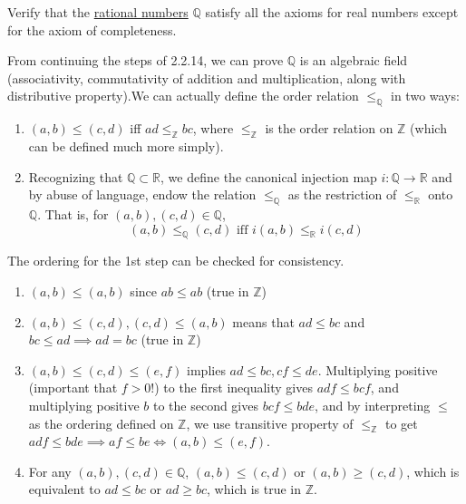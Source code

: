   \begin{exercise}[Zorich 2.2.13]
    Verify that the \hyperref[alg-def:rational-numbers]{rational numbers} $\mathbb{Q}$ satisfy all the axioms for real numbers except for the axiom of completeness. 
  \end{exercise}
  \begin{solution}
    From continuing the steps of 2.2.14, we can prove $\mathbb{Q}$ is an algebraic field (associativity, commutativity of addition and multiplication, along with distributive property).We can actually define the order relation $\leq_\mathbb{Q}$ in two ways: 
    \begin{enumerate}
      \item $(a, b) \leq (c, d)$ iff $ad \leq_{\mathbb{Z}} bc$, where $\leq_{\mathbb{Z}}$ is the order relation on $\mathbb{Z}$ (which can be defined much more simply). 
      \item Recognizing that $\mathbb{Q} \subset \mathbb{R}$, we define the canonical injection map $i: \mathbb{Q} \to \mathbb{R}$ and by abuse of language, endow the relation $\leq_{\mathbb{Q}}$ as the restriction of $\leq_{\mathbb{R}}$ onto $\mathbb{Q}$. That is, for $(a, b), (c, d) \in \mathbb{Q}$, 
      \begin{equation}
        (a, b) \leq_{\mathbb{Q}} (c, d) \text{ iff } i(a, b) \leq_{\mathbb{R}} i(c, d)
      \end{equation}
    \end{enumerate}
    The ordering for the 1st step can be checked for consistency. 
    \begin{enumerate}
      \item $(a, b) \leq (a, b)$ since $ab \leq ab$ (true in $\mathbb{Z}$) 
      \item $(a, b) \leq (c, d), (c, d) \leq (a, b)$ means that $ad \leq bc$ and $bc \leq ad \implies ad = bc$ (true in $\mathbb{Z}$) 
      \item $(a, b) \leq (c, d) \leq (e, f)$ implies $ad \leq bc, cf \leq de$. Multiplying positive (important that $f >0$!) to the first inequality gives $adf \leq bcf$, and multiplying positive $b$ to the second gives $bcf \leq bde$, and by interpreting $\leq$ as the ordering defined on $\mathbb{Z}$, we use transitive property of $\leq_\mathbb{Z}$ to get $adf \leq bde \implies af \leq be \iff (a, b) \leq (e, f)$. 
      \item For any $(a, b), (c, d) \in \mathbb{Q}$, $(a, b) \leq (c, d)$ or $(a, b) \geq (c, d)$, which is equivalent to $ad \leq bc$ or $ad \geq bc$, which is true in $\mathbb{Z}$. 

\end{enumerate}
\end{solution}
